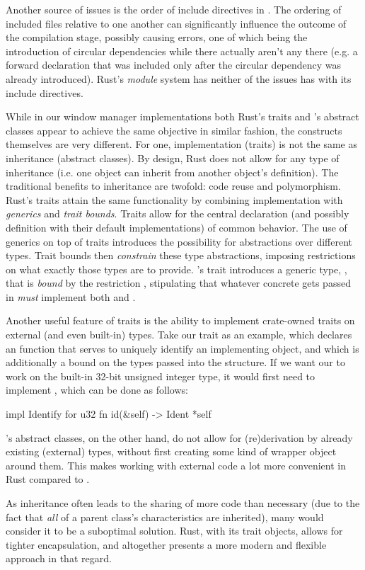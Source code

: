 Another source of issues is the order of include directives in \cpp. The
ordering of included files relative to one another can significantly influence
the outcome of the compilation stage, possibly causing errors, one of which
being the introduction of circular dependencies while there actually aren't any
there (e.g. a forward declaration that was included only after the circular
dependency was already introduced). Rust's \textit{module} system has neither of
the issues \cpp has with its include directives.

While in our window manager implementations both Rust's traits and \cpp's
abstract classes appear to achieve the same objective in similar fashion, the
constructs themselves are very different. For one, implementation (traits)
is not the same as inheritance (abstract classes). By design, Rust does not
allow for any type of inheritance (i.e. one object can inherit from another
object's definition). The traditional benefits to inheritance are twofold:
code reuse and polymorphism. Rust's traits attain the same functionality
by combining implementation with \textit{generics} and \textit{trait
bounds}\cite{therustbook, rustblogtraits}. Traits allow for the central
declaration (and possibly definition with their default implementations) of
common behavior\cite{therustbook, rustblogtraits}. The use of generics on
top of traits introduces the possibility for abstractions over different
types\cite{therustbook, rustblogtraits}. Trait bounds then \textit{constrain}
these type abstractions, imposing restrictions on what exactly those types
are to provide\cite{therustbook, rustblogtraits, therustreference}. \wmrs's
 trait introduces a generic type, , that is \textit{bound}
by the restriction , stipulating that whatever concrete
 gets passed in \textit{must} implement both  and
.

Another useful feature of traits is the ability to implement crate-owned
traits on external (and even built-in) types. Take our  trait
as an example, which declares an  function that serves to uniquely
identify an implementing object, and which is additionally a bound on the types
passed into the  structure. If we want our  to work on
the built-in 32-bit unsigned integer type, it would first need to implement
, which can be done as follows:

\begin{rustblock}
  impl Identify for u32 {
    fn id(&self) -> Ident {
      *self
    }
  }
\end{rustblock}

\cpp's abstract classes, on the other hand, do not allow for (re)derivation by
already existing (external) types, without first creating some kind of wrapper
object around them. This makes working with external code a lot more convenient
in Rust compared to \cpp.

As inheritance often leads to the sharing of more code than necessary (due to
the fact that \textit{all} of a parent class's characteristics are inherited),
many would consider it to be a suboptimal solution. Rust, with its trait
objects, allows for tighter encapsulation, and altogether presents a more modern
and flexible approach in that regard.
